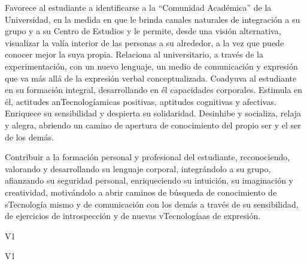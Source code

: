\begin{syllabus}


\begin{justification}
Favorece al estudiante a identificarse a la ``Comunidad Académica'' de la Universidad, en la medida en que le brinda canales naturales de integración a su grupo y  a su Centro de Estudios y le permite,  desde una visión alternativa, visualizar la valía interior de las personas a su alrededor, a la vez que puede conocer mejor la suya propia.
Relaciona al universitario, a través de la experimentación, con un nuevo lenguaje, un medio de comunicación y expresión que va más allá de la expresión verbal conceptualizada.
Coadyuva al estudiante en su formación integral, desarrollando en él  capacidades corporales. Estimula en él, actitudes anTecnologíamicas positivas,  aptitudes cognitivas y afectivas. Enriquece su sensibilidad y despierta su solidaridad.
Desinhibe y socializa, relaja y alegra,  abriendo un camino de apertura de conocimiento del propio ser y el ser de los demás.

\end{justification}

\begin{goals}
\item Contribuir a la formación personal y profesional del estudiante, reconociendo, valorando y desarrollando su lenguaje corporal, integrándolo a su grupo, afianzando su seguridad personal, enriqueciendo su intuición, su imaginación y creatividad, motivándolo  a abrir caminos de búsqueda  de conocimiento de sTecnología mismo y de comunicación con los demás a través de su sensibilidad, de ejercicios de introspección y de nuevas vTecnologíaas de expresión.
\end{goals}

\begin{outcomes}{V1}
    \item {}
    \item {}
\end{outcomes}

\begin{competences}{V1}
    \item {}
    \item {}
    \item {}
\end{competences}


\end{syllabus}
